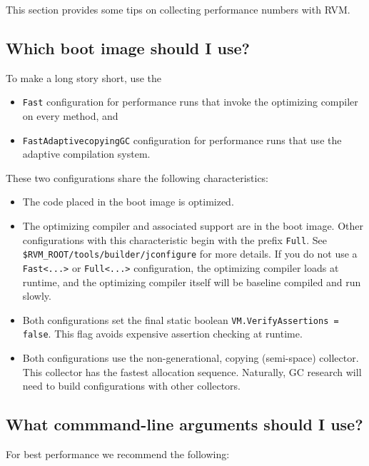 This section provides some tips on collecting performance numbers with
RVM.

\subsection{Which boot image should I use?}

To make a long story short, use the
\begin{itemize}
\item {\tt Fast} configuration for performance runs that invoke the optimizing compiler on every method, and
\item {\tt FastAdaptivecopyingGC} configuration for performance runs that use the adaptive compilation system.
\end{itemize}

These two configurations share the following characteristics:

\begin{itemize}
\item The code placed in the boot image is optimized.
\item The optimizing compiler and associated support are in
the boot image.  Other
configurations with this characteristic begin with the prefix {\tt Full}.
See {\tt \$RVM\_ROOT/tools/builder/jconfigure} for more details.
If you do not use a {\tt Fast<...>} or {\tt Full<...>} configuration, 
the optimizing
compiler loads at runtime, and the optimizing compiler itself will be
baseline compiled and run slowly.
\item Both configurations set the final static boolean
{\tt VM.VerifyAssertions = false}.  This flag avoids expensive assertion
checking at runtime.
\item Both configurations use the non-generational, copying (semi-space) 
collector.  This collector has the fastest allocation sequence.  
Naturally, GC research will need to build configurations with other
collectors.
\end{itemize}

\subsection{What commmand-line arguments should I use?}

For best performance we recommend the following:

